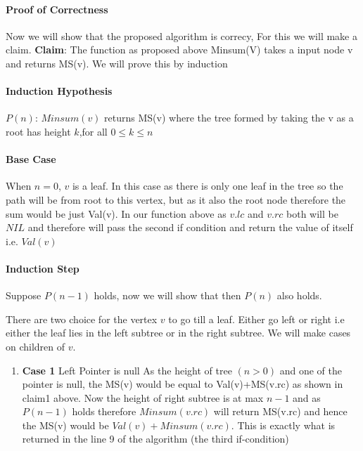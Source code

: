 \documentclass[answers]{exam}
\begin{document}
\begin{questions}
\begin{solution}
\begin{algorithmic}[1]
\EndFunction
\end{algorithmic}

\paragraph{Proof of Correctness} Now we will show that the proposed algorithm is correcy, For this we will make a claim.
\newline \textbf{Claim}: The function as proposed above Minsum(V) takes a input node v and returns MS(v).
We will prove this by induction
\paragraph{Induction Hypothesis} $P(n)$: $Minsum(v)$ returns MS(v) where the tree formed by taking the v as a root has height $k$,for all  $0\leq k\leq n $  

\paragraph{Base Case} When $n=0$,
$v$ is a leaf. In this case as there is only one leaf in the tree so the path will be from root to this vertex, but as it also the root node therefore the sum would be just Val(v). In our function above as $v.lc$ and $v.rc$ both will be $NIL$ and therefore will pass the second if condition and return the value of itself i.e. $Val(v)$

\paragraph{Induction Step} Suppose $P(n-1)$ holds, now we will show that then $P(n)$ also holds.

There are two choice for the vertex $v$ to go till a leaf. Either go left or right i.e either the leaf lies in the left subtree or in the right subtree. We will make cases on children of $v$.

\begin{enumerate}
\item \textbf{Case 1} Left Pointer is null
\newline As the height of tree $(n>0)$ and one of the pointer is null, the MS(v) would be equal to Val(v)+MS(v.rc) as shown in claim1 above. 
\newline Now the height of right subtree is at max $n-1$ and as $P(n-1)$ holds therefore $Minsum(v.rc)$ will return MS(v.rc) and hence the MS(v) would be $Val(v)+Minsum(v.rc)$. This is exactly what is returned in the line 9 of the algorithm (the third if-condition)


\end{enumerate}
\end{solution}
\end{questions}
\end{document}
